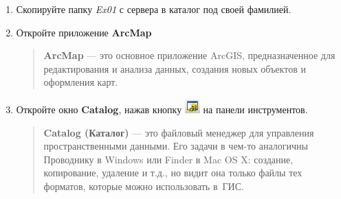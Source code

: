 \documentclass[12pt,]{book}
\begin{document}
\begin{enumerate}
\def\labelenumi{\arabic{enumi}.}
\item
  Скопируйте папку \emph{Ex01} с сервера в каталог под своей фамилией.
\item
  Откройте приложение \textbf{ArcMap}

  \begin{quote}
  \textbf{ArcMap} --- это основное приложение ArcGIS, предназначенное для редактирования и анализа данных, создания новых объектов и оформления карт.
  \end{quote}
\item
  Откройте окно \textbf{Catalog}, нажав кнопку \includegraphics{images/Ex01/image2.png} на панели инструментов.

  \begin{quote}
  \textbf{Catalog (Каталог)} --- это файловый менеджер для управления пространственными данными. Его задачи в чем-то аналогичны Проводнику в Windows или Finder в Mac OS X: создание, копирование, удаление и т.д., но видит она только файлы тех форматов, которые можно использовать в~ГИС.
  \end{quote}


\end{enumerate}
\end{document}
